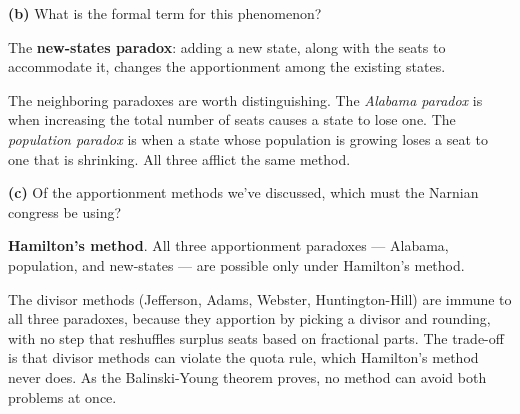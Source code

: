 \documentclass[12pt]{ximera}
\begin{document}
\begin{problem}
\begin{prompt}
\textbf{(b)} What is the formal term for this phenomenon?

\begin{multipleChoice}
\end{multipleChoice}

\begin{feedback}
The \textbf{new-states paradox}: adding a new state, along with the seats to
accommodate it, changes the apportionment among the existing states.

The neighboring paradoxes are worth distinguishing. The \emph{Alabama paradox} is when
increasing the total number of seats causes a state to lose one. The \emph{population
paradox} is when a state whose population is growing loses a seat to one that is
shrinking. All three afflict the same method.
\end{feedback}
\end{prompt}

\begin{prompt}
\textbf{(c)} Of the apportionment methods we've discussed, which must the Narnian
congress be using?

\begin{multipleChoice}
\end{multipleChoice}

\begin{feedback}
\textbf{Hamilton's method}. All three apportionment paradoxes --- Alabama, population,
and new-states --- are possible only under Hamilton's method.

The divisor methods (Jefferson, Adams, Webster, Huntington-Hill) are immune to all
three paradoxes, because they apportion by picking a divisor and rounding, with no
step that reshuffles surplus seats based on fractional parts. The trade-off is that
divisor methods can violate the quota rule, which Hamilton's method never does. As the
Balinski-Young theorem proves, no method can avoid both problems at once.
\end{feedback}
\end{prompt}
\end{problem}
\end{document}

